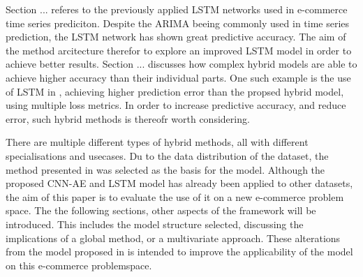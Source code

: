 Section ... referes to the previously applied LSTM networks used in e-commerce time series prediciton.
Despite the ARIMA beeing commonly used in time series prediction, the LSTM network has shown great predictive accuracy.
The aim of the method arcitecture therefor to explore an improved LSTM model in order to achieve better results.
Section ... discusses how complex hybrid models are able to achieve higher accuracy than their individual parts.
One such example is the use of LSTM in \cite{Zhao2019}, achieving higher prediction error than the propsed hybrid model, using multiple loss metrics.
In order to increase predictive accuracy, and reduce error, such hybrid methods is thereofr worth considering.


There are multiple different types of hybrid methods, all with different specialisations and usecases.
Du to the data distribution of the dataset, the method presented in \cite{Zhao2019} was selected as the basis for the model.
Although the proposed CNN-AE and LSTM model has already been applied to other datasets, the aim of this paper is to evaluate the use of it on a new e-commerce problem space.
The the following sections, other aspects of the framework will be introduced.
This includes the model structure selected, discussing the implications of a global method, or a multivariate approach.
These alterations from the model proposed in \cite{Zhao2019} is intended to improve the applicability of the model on this e-commerce problemspace.

